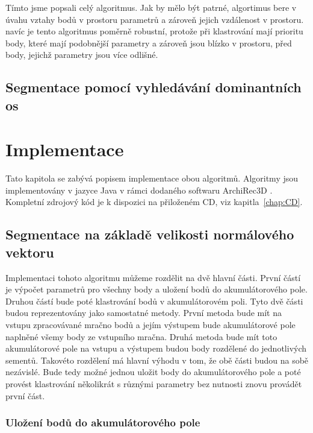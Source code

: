 \documentclass[11pt,twoside,a4paper]{book}
\begin{document}
Tímto jsme popsali celý algoritmus. Jak by mělo být patrné, algortimus bere v úvahu vztahy bodů v prostoru parametrů a zároveň jejich vzdálenost v prostoru. navíc je tento algoritmus poměrně robustní, protože při klastrování mají prioritu body, které mají podobnější parametry a zároveň jsou blízko v prostoru, před body, jejichž parametry jsou více odlišné.

\section{Segmentace pomocí vyhledávání dominantních os}

\cite{Seg02}


\chapter{Implementace}

Tato kapitola se zabývá popisem implementace obou algoritmů. Algoritmy jsou implementovány v jazyce Java v rámci dodaného softwaru ArchiRec3D \cite{AR3D}. Kompletní zdrojový kód je k dispozici na přiloženém CD, viz kapitla~\ref{chap:CD}.

\section{Segmentace na základě velikosti normálového vektoru}

Implementaci tohoto algoritmu můžeme rozdělit na dvě hlavní části. První částí je výpočet parametrů pro všechny body a uložení bodů do akumulátorového pole. Druhou částí bude poté klastrování bodů v akumulátorovém poli. Tyto dvě části budou reprezentovány jako samostatné metody. První metoda bude mít na vstupu zpracovávané mračno bodů a jejím výstupem bude akumulátorové pole naplněné všemy body ze vstupního mračna. Druhá metoda bude mít toto akumulátorové pole na vstupu a výstupem budou body rozdělené do jednotlivých sementů. Takovéto rozdělení má hlavní výhodu v tom, že obě části budou na sobě nezávislé. Bude tedy možné jednou uložit body do akumulátorového pole a poté provést klastrování několikrát s různými parametry bez nutnosti znovu provádět první část.

\subsection{Uložení bodů do akumulátorového pole}
\end{document}

